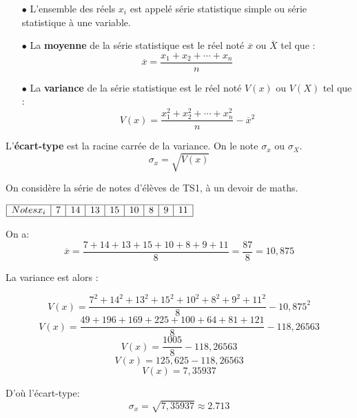 \begin{definition}

\begin{itemize}
\item[$  \bullet$] L'ensemble des réels $x_i$ est appelé série statistique simple ou série statistique à une variable.
\item[$  \bullet$] La    \textbf{moyenne} de la série statistique est le réel noté  $ \overline{x} $ ou       $ \overline{X} $ tel que : $$ \overline{x} = \frac{x_{1}+x_{2}+\cdots +x_{n}}{n}$$
\item[$  \bullet$] La  \textbf{variance} de la série statistique  est le réel noté  $V(x)$ ou $V(X)$ tel que :
$$ V(x) = \frac{x_{1}^{2}+x_{2}^{2}+\cdots +x_{n}^{2}}{n}-\overline{x}^{2}$$
\end{itemize}
L'\textbf{écart-type} est la racine carrée de la variance. On le note  $ \sigma _{x} $ ou $ \sigma_X $. $$ \sigma_x=\sqrt{V(x)} $$
\end{definition}





\medskip

\begin{example}

On considère la série de notes d'élèves de TS1, à un devoir de maths.
\begin{center}
   $\begin{array}{|c|c|c|c|c|c|c|c|c|}
\hline
 Notes  x_{i}  & 7&  14&13&15&  10 &8 &9& 11 \\
\hline
\end{array}$
\end{center}




\medskip

 On a: \; $$  \overline{x}=\dfrac{7+ 14+13+15+  10 +8 +9+ 11}{8} =\dfrac{87}{8}=10,875$$ 
 
 La variance est alors :
 
 $$  V(x)=\dfrac{7^{2}+ 14^{2}+13^{2}+15^{2}+  10^{2} +8^{2} +9^{2}+ 11^{2}}{8}-10,875^{2} $$ 
  $$  V(x)=\dfrac{49+ 196+169+225+  100 +64 +81+ 121}{8}-118,26563 $$ 
    $$  V(x)=\dfrac{1005}{8}-118,26563 $$ 
    $$  V(x)=  125,625-118,26563$$ 
    $$  V(x)=7,35937$$ 
    
   D'où l'écart-type:
    $$ \sigma_x=\sqrt{7,35937}\approx2.713$$
\end{example}


